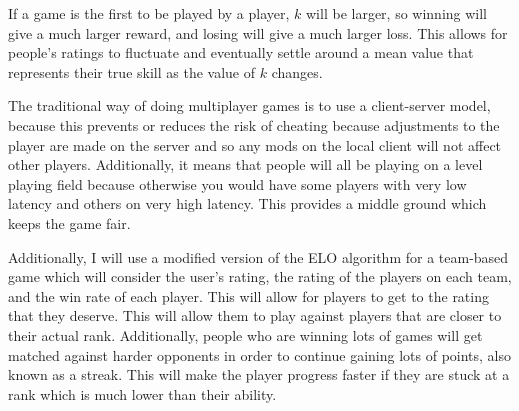 If a game is the first to be played by a player, $k$ will be larger, so winning will give a much larger reward, and losing will give a much larger loss. This allows for people's ratings to fluctuate and eventually settle around a mean value that represents their true skill as the value of $k$ changes.


\vspace{11pt}
The traditional way of doing multiplayer games is to use a client-server model, because this prevents or reduces the risk of cheating because adjustments to the player are made on the server and so any mods on the local client will not affect other players. Additionally, it means that people will all be playing on a level playing field because otherwise you would have some players with very low latency and others on very high latency. This provides a middle ground which keeps the game fair.





Additionally, I will use a modified version of the ELO algorithm for a team-based game which will consider the user's rating, the rating of the players on each team, and the win rate of each player. This will allow for players to get to the rating that they deserve. This will allow them to play against players that are closer to their actual rank. Additionally, people who are winning lots of games will get matched against harder opponents in order to continue gaining lots of points, also known as a streak. This will make the player progress faster if they are stuck at a rank which is much lower than their ability.
